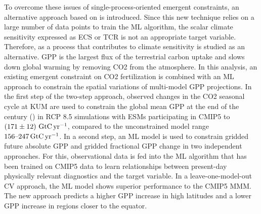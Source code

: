 To overcome these issues of single-process-oriented emergent constraints, an
alternative approach based on  is introduced. Since this new
technique relies on a large number of data points to train the \acs{ML}
algorithm, the scalar climate sensitivity expressed as \acs{ECS} or \acs{TCR}
is not an appropriate target variable. Therefore,  as a
process that contributes to climate sensitivity is studied as an alternative.
\acs{GPP} is the largest flux of the terrestrial carbon uptake and slows down
global warming by removing \acs{CO2} from the atmosphere. In this analysis, an
existing emergent constraint on \acs{CO2} fertilization is combined with an
\acs{ML} approach to constrain the spatial variations of multi-model \acs{GPP}
projections. In the first step of the two-step approach, observed changes in
the \acs{CO2} seasonal cycle at \acl{KUM} are used to constrain the global mean
\acs{GPP} at the end of the  century () in \acl{RCP}
8.5 simulations with \acsp{ESM} participating in \acs{CMIP}5 to
$\pmrangeunit{171}{12}{\GtCyr{}}$, compared to the unconstrained model range
$\rangeunit{156}{247}{\GtCyr{}}$. In a second step, an \acs{ML} model is used
to constrain gridded future absolute \acs{GPP} and gridded fractional \acs{GPP}
change in two independent approaches. For this, observational data is fed into
the \acs{ML} algorithm that has been trained on \acs{CMIP}5 data to learn
relationships between present-day physically relevant diagnostics and the
target variable. In a leave-one-model-out \acl{CV} approach, the \acs{ML} model
shows superior performance to the \acs{CMIP}5 \acs{MMM}. The new approach
predicts a higher \acs{GPP} increase in high latitudes and a lower \acs{GPP}
increase in regions closer to the equator.
